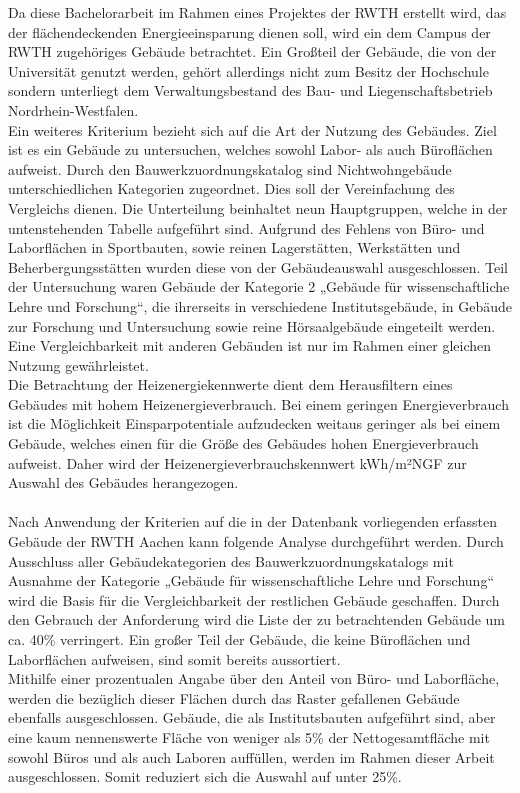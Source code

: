 Da diese Bachelorarbeit im Rahmen eines Projektes der RWTH erstellt wird, das der flächendeckenden Energieeinsparung dienen soll, wird ein dem Campus der RWTH zugehöriges Gebäude betrachtet. Ein Großteil der Gebäude, die von der Universität genutzt werden, gehört allerdings nicht zum Besitz der Hochschule sondern unterliegt dem Verwaltungsbestand des Bau- und Liegenschaftsbetrieb Nordrhein-Westfalen. \\
Ein weiteres Kriterium bezieht sich auf die Art der Nutzung des Gebäudes. Ziel ist es ein Gebäude zu untersuchen, welches sowohl Labor- als auch Büroflächen aufweist. Durch den Bauwerkzuordnungskatalog sind Nichtwohngebäude unterschiedlichen Kategorien zugeordnet. Dies soll der Vereinfachung des Vergleichs dienen. Die Unterteilung beinhaltet neun Hauptgruppen, welche in der untenstehenden Tabelle aufgeführt sind. 
Aufgrund des Fehlens von Büro- und Laborflächen in Sportbauten, sowie reinen Lagerstätten, Werkstätten und Beherbergungsstätten wurden diese von der Gebäudeauswahl ausgeschlossen. Teil der Untersuchung waren Gebäude der Kategorie 2 „Gebäude für wissenschaftliche Lehre und Forschung“, die ihrerseits in verschiedene Institutsgebäude, in Gebäude zur Forschung und Untersuchung sowie reine Hörsaalgebäude eingeteilt werden. Eine Vergleichbarkeit mit anderen Gebäuden ist nur im Rahmen einer gleichen Nutzung gewährleistet.\\
Die Betrachtung der Heizenergiekennwerte dient dem Herausfiltern eines Gebäudes mit hohem Heizenergieverbrauch. Bei einem geringen Energieverbrauch ist die Möglichkeit Einsparpotentiale aufzudecken weitaus geringer als bei einem Gebäude, welches einen für die Größe des Gebäudes hohen Energieverbrauch aufweist. Daher wird der Heizenergieverbrauchskennwert kWh/m²NGF zur Auswahl des Gebäudes herangezogen. \\
\\
Nach Anwendung der Kriterien auf die in der Datenbank vorliegenden erfassten Gebäude der RWTH Aachen kann folgende Analyse durchgeführt werden.  Durch Ausschluss aller Gebäudekategorien des Bauwerkzuordnungskatalogs mit Ausnahme der Kategorie „Gebäude für wissenschaftliche Lehre und Forschung“ wird die Basis für die Vergleichbarkeit der restlichen Gebäude geschaffen. Durch den Gebrauch der Anforderung wird die Liste der zu betrachtenden Gebäude um ca. 40\% verringert. Ein großer Teil der Gebäude, die keine Büroflächen und Laborflächen aufweisen, sind somit bereits aussortiert.\\
Mithilfe einer prozentualen Angabe über den Anteil von Büro- und Laborfläche, werden die bezüglich dieser Flächen durch das Raster gefallenen Gebäude ebenfalls ausgeschlossen. Gebäude, die als Institutsbauten aufgeführt sind, aber eine kaum nennenswerte Fläche von weniger als 5\% der Nettogesamtfläche mit sowohl Büros und als auch Laboren auffüllen, werden im Rahmen dieser Arbeit ausgeschlossen. Somit reduziert sich die Auswahl auf unter 25\%.\\

